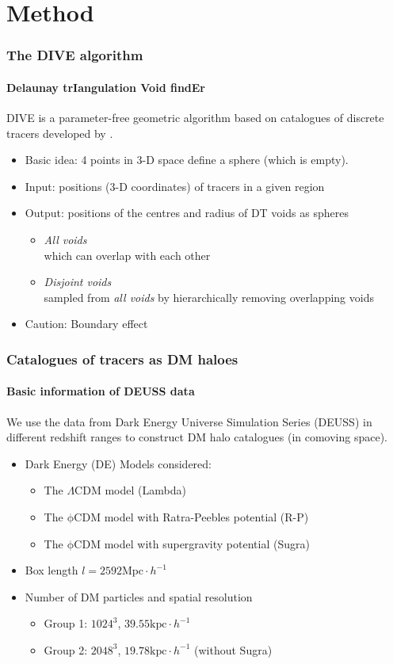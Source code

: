 \documentclass{beamer}
\newtheorem{Narrow down the analysis}{Narrow down the analysis}
\begin{document}
\section{Method}
\begin{frame}
	\frametitle{The DIVE algorithm}
	\framesubtitle{Delaunay trIangulation Void findEr}
	\pause DIVE is a parameter-free geometric algorithm based on catalogues of discrete tracers developed by \citet{Zhao2016}.
	\begin{itemize}
	\pause \item[\checkmark] Basic idea: 4 points in 3-D space define a sphere (which is empty).
	\pause \item Input: positions (3-D coordinates) of tracers in a given region
	\pause \item Output: positions of the centres and radius of DT voids as spheres
		\begin{itemize}
		\pause \item \textit{All voids} \\
		\pause which can overlap with each other
		\pause \item \textit{Disjoint voids}\\
		 \pause sampled from \textit{all voids} by hierarchically removing overlapping voids 
		\end{itemize}
	\pause \item[\checkmark] Caution: Boundary effect 
	\end{itemize}
\end{frame}

\begin{frame}
	\frametitle{Catalogues of tracers as DM haloes}
	\framesubtitle{Basic information of DEUSS data}
	\pause We use the data from Dark Energy Universe Simulation Series (DEUSS) in different redshift ranges \citep{Rasera2010} to construct DM halo catalogues (in comoving space).
	\begin{itemize}
	\pause \item Dark Energy (DE) Models considered:
		\begin{itemize}
		\pause \item The $\Lambda\mathrm{CDM}$ model (Lambda)
		\pause \item The $\mathrm{\phi CDM}$ model with Ratra-Peebles potential (R-P) 
		\pause \item The $\mathrm{\phi CDM}$ model with supergravity potential (Sugra)
		\end{itemize}
	\pause \item Box length $l=2592\mathrm{Mpc}\cdot h^{-1}$
	\pause \item Number of DM particles and spatial resolution
		\begin{itemize}
		\item Group 1: $1024^{3}$, $39.55\mathrm{kpc}\cdot h^{-1}$
		\item Group 2: $2048^{3}$, $19.78\mathrm{kpc}\cdot h^{-1}$ (without Sugra)
		\end{itemize}
	\end{itemize}
\end{frame}
\end{document}
